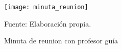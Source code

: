 
\begin{figure}[h]
\centering
\texttt{[image: minuta\_reunion]}
\caption{\label{fig:Minuta1} Minuta de reunion con profesor guía} Fuente: Elaboración propia.
\end{figure}

